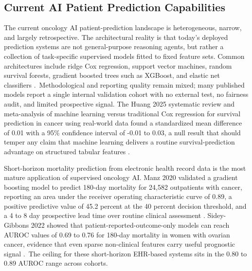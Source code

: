 \documentclass[11pt]{article}
\begin{document}
\clearpage








\subsection{Current AI Patient Prediction Capabilities}
\label{sec:intro-ai-baseline}

The current oncology AI patient-prediction landscape is heterogeneous,
narrow, and largely retrospective. The architectural reality is that
today's deployed prediction systems are not general-purpose reasoning
agents, but rather a collection of task-specific supervised models
fitted to fixed feature sets. Common architectures include ridge Cox
regression, support vector machines, random survival forests, gradient
boosted trees such as XGBoost, and elastic net classifiers
\cite{Smiley2025OncologyMLReportingQuality}.\ Methodological and
reporting quality remain mixed; many published models report a single
internal validation cohort with no external test, no fairness audit,
and limited prospective signal. The Huang 2025 systematic review and
meta-analysis of machine learning versus traditional Cox regression for
survival prediction in cancer using real-world data found a
standardized mean difference of 0.01 with a 95\% confidence interval
of -0.01 to 0.03, a null result that should temper any claim that
machine learning delivers a routine survival-prediction
advantage on structured tabular features
\cite{Huang2025CancerSurvivalMetaAnalysis}.

Short-horizon mortality prediction from electronic health record data
is the most mature application of supervised oncology AI. Manz 2020
validated a gradient boosting model to predict 180-day mortality for
24,582 outpatients with cancer, reporting an area under the receiver
operating characteristic curve of 0.89, a positive predictive value of
45.2 percent at the 40 percent decision threshold, and a 4 to 8 day
prospective lead time over routine clinical assessment
\cite{Manz2020Oncology180DayMortality}. Sidey-Gibbons 2022 showed that
patient-reported-outcome-only models can reach AUROC values of 0.69 to
0.76 for 180-day mortality in women with ovarian cancer, evidence that
even sparse non-clinical features carry useful prognostic signal
\cite{SideyGibbons2022OvarianPROMortality}.\ The ceiling for these
short-horizon EHR-based systems sits in the 0.80 to 0.89 AUROC range
across cohorts.
\end{document}
